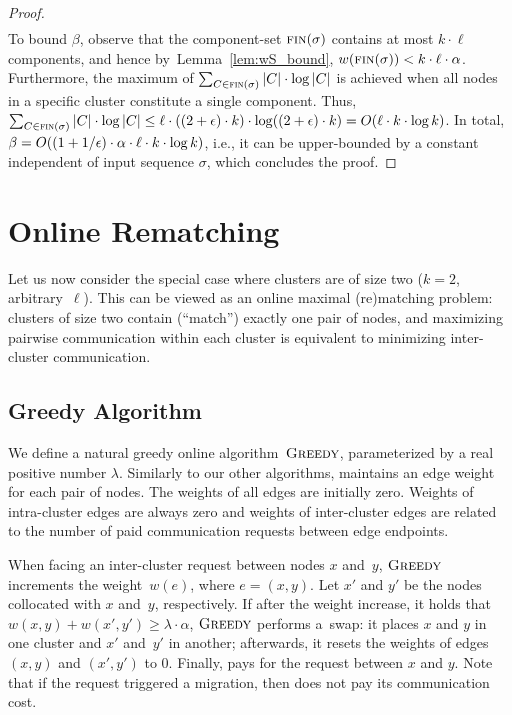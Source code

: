\begin{proof}
\begin{align*}
\end{align*}
To bound $\beta$, observe that the component-set $\textsc{fin}(\sigma)$
contains at most $k \cdot \ell$ components, and hence
by~Lemma~\ref{lem:wS_bound}, $w(\textsc{fin}(\sigma)) < k \cdot \ell \cdot
\alpha$. Furthermore, the maximum of $\sum_{C \in \textsc{fin}(\sigma)} |C| \cdot
\log |C|$ is achieved when all nodes in a specific cluster constitute a single
component. Thus, $\sum_{C \in \textsc{fin}(\sigma)} |C| \cdot \log |C|
\leq \ell \cdot ((2+\epsilon) \cdot k) \cdot \log ((2+\epsilon) \cdot k) = O(\ell
\cdot k \cdot \log k)$.
In total, $\beta = O((1 + 1/\epsilon) \cdot \alpha \cdot \ell \cdot k \cdot \log k)$, 
i.e., it can be upper-bounded by a constant independent of input sequence $\sigma$,
which concludes the proof.
\end{proof}




\section{Online Rematching}
\label{sec:k-two}

Let us now consider the special case where clusters are of size two ($k=2$,
arbitrary~$\ell$). This can be viewed as an online maximal (re)matching problem:
clusters of size two contain (``match'') exactly one pair of nodes, and
maximizing pairwise communication within each cluster is equivalent to
minimizing inter-cluster communication. 


\subsection{Greedy Algorithm}

We define a natural greedy online algorithm~$\textsc{Greedy}$, parameterized by a real
positive number $\lambda$. Similarly to our other algorithms,
\GREEDY  maintains an edge weight for each pair of nodes. 
The weights of all edges are initially zero. Weights of intra-cluster edges
are always zero and weights of inter-cluster edges are related to the number
of paid communication requests between edge endpoints. 

When facing an inter-cluster request between nodes $x$
and~$y$, $\textsc{Greedy}$ increments the weight~$w(e)$, where $e = (x,y)$. Let $x'$
and $y'$ be the nodes collocated with $x$ and~$y$, respectively. If after the
weight increase, it holds that $w(x,y) + w(x',y') \geq \lambda
\cdot \alpha$, $\textsc{Greedy}$ performs a~swap: it places $x$ and $y$ in one
cluster and $x'$ and~$y'$ in another; afterwards, it resets the weights of
edges $(x,y)$ and $(x',y')$ to 0. Finally, \GREEDY pays for the request
between $x$ and $y$. Note that if the request triggered a migration, then
\GREEDY does not pay its communication cost.


